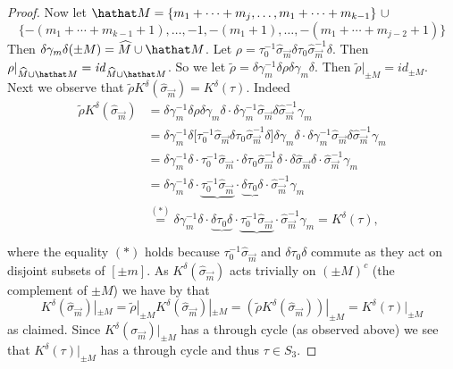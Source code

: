 \documentclass[11pt]{amsart}
\theoremstyle{definition}
\numberwithin{theorem}{section}
\newcommand{\vm}{{\vec{m}}}
\newcommand{\sz}{{\scriptscriptstyle0}}
\newcommand{\id}{\mathit{id}}
\begin{document}
\begin{proof}
\noindent
Now let 
\hfill$
\hathat M = \{
m_1 + \cdots + m_j, \dots, m_1 + \cdots + m_{k-1} \} \ \cup
$\hfill\hbox{}
\[ \{ 
-(m_1 + \cdots + m_{k-1} + 1), \dots, -1, -(m_1 + 1), 
\dots, -(m_1 + \cdots + m_{j-2} + 1)\}
\]
Then $\delta\gamma_m\delta(\pm M) = \widehat{M} \cup \hathat
M$. Let $\rho = \tau_\sz^{-1} \hat\sigma_\vm \delta \tau_\sz
\hat\sigma_\vm^{-1} \delta$. Then $\rho|_{\widehat{M} \cup
  \hathat M} = \id_{\widehat{M} \cup \hathat M}$. So we let
$\tilde\rho = \delta \gamma_m^{-1} \delta \rho \delta
\gamma_m \delta$. Then $\tilde\rho|_{\pm M} = \id_{\pm
  M}$. Next we observe that $\tilde \rho K^\delta(\hat
\sigma_\vm) = K^\delta(\tau)$. Indeed
\begin{align*}
\tilde \rho  K^\delta(\hat \sigma_\vm) 
& =
\delta \gamma_m^{-1} \delta \rho \delta \gamma_m \delta \cdot \delta \gamma_m^{-1}
\hat \sigma_\vm \delta \hat \sigma_\vm^{-1} \gamma_m \\
& =
\delta \gamma_m^{-1} \delta \big[ \tau_\sz^{-1} \hat\sigma_\vm \delta \tau_\sz \hat \sigma_\vm^{-1} \delta \big] \delta \gamma_m \delta \cdot \delta \gamma_m^{-1} \hat\sigma_\vm \delta \hat\sigma_\vm^{-1} \gamma_m \\
& =
\delta \gamma_m^{-1} \delta  \cdot \tau_\sz^{-1} \hat \sigma_\vm \cdot \delta \tau_\sz \hat \sigma_\vm^{-1} \delta \cdot \delta \hat\sigma_\vm \delta \cdot \hat\sigma_\vm^{-1} \gamma_m  \\
& =
\delta \gamma_m^{-1} \delta  \cdot \underbrace{\tau_\sz^{-1} \hat \sigma_\vm} \cdot 
 \underbrace{\delta \tau_\sz  \delta} \cdot \hat\sigma_\vm^{-1} \gamma_m \\
& \stackrel{(*)}{=}
\delta \gamma_m^{-1} \delta  \cdot  \underbrace{\delta \tau_\sz  \delta} \cdot 
\underbrace{\tau_\sz^{-1} \hat \sigma_\vm} \cdot  \hat\sigma_\vm^{-1} \gamma_m = K^\delta(\tau),\\
\end{align*}
where the equality $(*)$ holds because $\tau_\sz^{-1} \hat\sigma_\vm$ and $\delta \tau_\sz \delta$ commute as they act on disjoint subsets of $[\pm m]$. As 
$K^\delta(\hat \sigma_\vm)$ acts trivially on $(\pm M)^c$ (the complement of $\pm M$) we have by \cite[Lemma 6]{mst} that
\[
 K^\delta(\hat \sigma_\vm) |_{\pm M} = \tilde \rho|_{\pm M}  K^\delta(\hat \sigma_\vm) |_{\pm M} = ( \tilde \rho  K^\delta(\hat \sigma_\vm)) |_{\pm M}
= K^\delta(\tau)|_{\pm M}
\]
as claimed. Since $K^\delta(\sigma_\vm)|_{\pm M}$ has a
through cycle (as observed above) we see that
$K^\delta(\tau)|_{\pm M}$ has a through cycle and thus $\tau
\in S_3$.




\end{proof}
\end{document}
